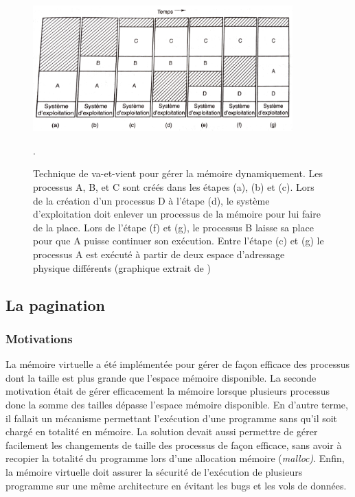 \begin{figure}
    \center
    \includegraphics[width=10cm]{images/memory_swapping.png}
    \caption{\label{pic:memory_swapping} Technique de va-et-vient pour gérer la mémoire dynamiquement. Les processus A, B, et C sont créés dans les étapes (a), (b) et (c). Lors de la création d'un processus D à l'étape (d), le système d'exploitation doit enlever un processus de la mémoire pour lui faire de la place. Lors de l'étape (f) et (g), le processus B laisse sa place pour que A puisse continuer son exécution. Entre l'étape (c) et (g) le processus A est exécuté à partir de deux espace d'adressage physique différents (graphique extrait de \cite{tanenbaum2008systeme})}.
\end{figure}





\subsection{La pagination}


\subsubsection{Motivations}
La mémoire virtuelle a été implémentée pour gérer de façon efficace des processus dont la taille est plus grande que l'espace mémoire disponible. La seconde motivation était de gérer efficacement la mémoire lorsque plusieurs processus donc la somme des tailles dépasse l'espace mémoire  disponible. En d'autre terme, il fallait un mécanisme permettant l'exécution d'une programme sans qu'il soit chargé en totalité en mémoire. La solution devait aussi permettre de gérer facilement les changements de taille des processus de façon efficace, sans avoir à recopier la totalité du programme lors d'une allocation mémoire (\textit{malloc)}. Enfin, la mémoire virtuelle doit assurer la sécurité de l'exécution de plusieurs programme sur une même architecture en évitant les bugs et les vols de données.


